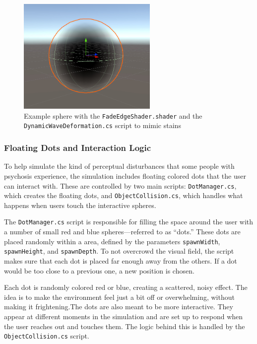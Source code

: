 \begin{figure}[h!] 
    \centering 
    \includegraphics[width=0.6\textwidth]{../../Figures/fadeedgeshader.jpg} 
    \caption{Example sphere with the \texttt{FadeEdgeShader.shader} and the \texttt{DynamicWaveDeformation.cs} script to mimic stains} 
    \label{fig:fadeedgeshader} 
\end{figure}

\subsubsection{Floating Dots and Interaction Logic}

To help simulate the kind of perceptual disturbances that some people with psychosis experience, the simulation includes floating colored dots that the user can interact with. These are controlled by two main scripts: \texttt{DotManager.cs}, which creates the floating dots, and \texttt{ObjectCollision.cs}, which handles what happens when users touch the interactive spheres.

\vspace{1em}

The \texttt{DotManager.cs} script is responsible for filling the space around the user with a number of small red and blue spheres—referred to as “dots.” These dots are placed randomly within a area, defined by the parameters \texttt{spawnWidth}, \texttt{spawnHeight}, and \texttt{spawnDepth}. To not overcrowd the visual field, the script makes sure that each dot is placed far enough away from the others. If a dot would be too close to a previous one, a new position is chosen.

Each dot is randomly colored red or blue, creating a scattered, noisy effect. The idea is to make the environment feel just a bit off or overwhelming, without making it frightening.The dots are also meant to be more interactive. They appear at different moments in the simulation and are set up to respond when the user reaches out and touches them. The logic behind this is handled by the \texttt{ObjectCollision.cs} script.

